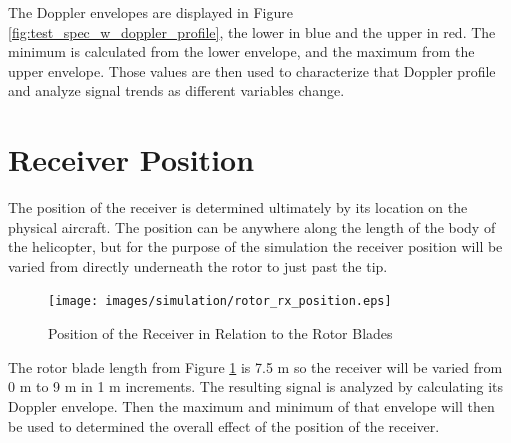 The Doppler envelopes are displayed in Figure \ref{fig:test_spec_w_doppler_profile}, the lower in blue and the upper in red. The minimum is calculated from the lower envelope, and the maximum from the upper envelope. Those values are then used to characterize that Doppler profile and analyze signal trends as different variables change.

\section{Receiver Position}
The position of the receiver is determined ultimately by its location on the physical aircraft. The position can be anywhere along the length of the body of the helicopter, but for the purpose of the simulation the receiver position will be varied from directly underneath the rotor to just past the tip. 

\begin{figure}
	\begin{center}
		\texttt{[image: images/simulation/rotor\_rx\_position.eps]}
		\caption{Position of the Receiver in Relation to the Rotor Blades}
		\label{fig:rx_position_image}
	\end{center}
\end{figure}

The rotor blade length from Figure \ref{fig:rx_position_image} is 7.5 m so the receiver will be varied from 0 m to 9 m in 1 m increments. The resulting signal is analyzed by calculating its Doppler envelope. Then the maximum and minimum of that envelope will then be used to determined the overall effect of the position of the receiver.

